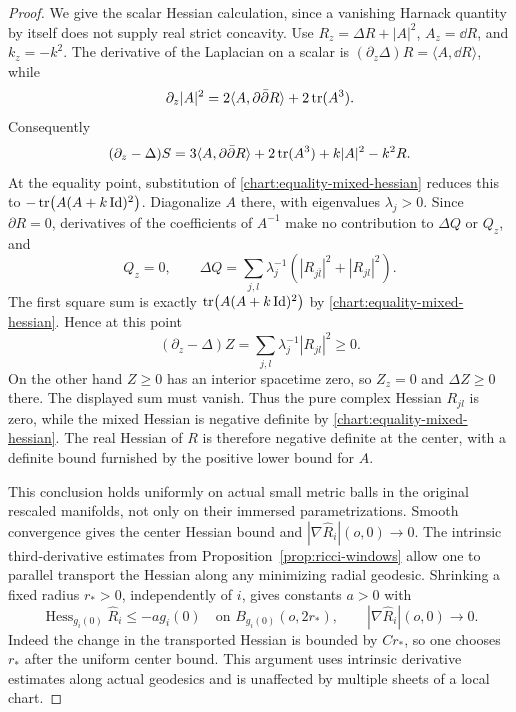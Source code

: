 \begin{proof}
We give the scalar Hessian calculation, since a vanishing
Harnack quantity by itself does not supply real strict concavity.
Use $R_z=\Delta R+|A|^2$, $A_z=\dd R$, and $k_z=-k^2$.
The derivative of the Laplacian on a scalar is
$(\partial_z\Delta)R=\langle A,\dd R\rangle$, while
\[
 \partial_z|A|^2=2\langle A,\partial\bar\partial R\rangle+2\operatorname{tr}(A^3).
\]
Consequently
\begin{equation}\label{chart:equality-evolution}
 (\partial_z-\Delta)S
 =3\langle A,\partial\bar\partial R\rangle+2\operatorname{tr}(A^3)
     +k|A|^2-k^2R.
\end{equation}
At the equality point, substitution of
\eqref{chart:equality-mixed-hessian} reduces this to
$-\operatorname{tr}\bigl(A(A+k\operatorname{Id})^2\bigr)$.
Diagonalize $A$ there, with eigenvalues $\lambda_j>0$.
Since $\partial R=0$, derivatives of the coefficients of
$A^{-1}$ make no contribution to $\Delta Q$ or $Q_z$, and
\[
 Q_z=0,\qquad
 \Delta Q=\sum_{j,l}\lambda_j^{-1}
       \left(|R_{j\bar l}|^2+|R_{jl}|^2\right).
\]
The first square sum is exactly
$\operatorname{tr}\bigl(A(A+k\operatorname{Id})^2\bigr)$ by
\eqref{chart:equality-mixed-hessian}.  Hence at this point
\[
 (\partial_z-\Delta)Z
 =\sum_{j,l}\lambda_j^{-1}|R_{jl}|^2\ge0.
\]
On the other hand $Z\ge0$ has an interior spacetime zero, so
$Z_z=0$ and $\Delta Z\ge0$ there.  The displayed sum must
vanish.  Thus the pure complex Hessian $R_{jl}$ is zero, while
the mixed Hessian is negative definite by
\eqref{chart:equality-mixed-hessian}.  The real Hessian of $R$
is therefore negative definite at the center, with a definite
bound furnished by the positive lower bound for $A$.

This conclusion holds uniformly on actual small metric balls
in the original rescaled manifolds, not only on their immersed
parametrizations.  Smooth convergence gives the center Hessian
bound and $|\nabla\widehat R_i|(o,0)\to0$.  The intrinsic
third-derivative estimates from
Proposition~\ref{prop:ricci-windows} allow one to parallel
transport the Hessian along any minimizing radial geodesic.
Shrinking a fixed radius $r_*>0$, independently of $i$, gives
constants $a>0$ with
\begin{equation}\label{chart:intrinsic-concavity}
 \operatorname{Hess}_{g_i(0)}\widehat R_i
       \le-a g_i(0)
 \quad\text{on }B_{g_i(0)}(o,2r_*),\qquad
 |\nabla\widehat R_i|(o,0)\longrightarrow0.
\end{equation}
Indeed the change in the transported Hessian is bounded by
$Cr_*$, so one chooses $r_*$ after the uniform center bound.
This argument uses intrinsic derivative estimates along actual
geodesics and is unaffected by multiple sheets of a local chart.


\end{proof}
